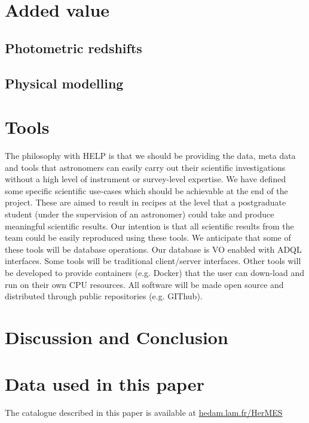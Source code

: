 \documentclass[usenatbib]{mnras}
\begin{document}
\section{Added value}

\subsection{Photometric redshifts}

\subsection{Physical modelling}

\section{Tools}

The philosophy with HELP is that we should be providing the data, meta data and
tools that astronomers can easily carry out their scientific investigations
without a high level of instrument or survey-level expertise.  We have defined
some specific scientific use-cases which should be achievable at the end of the
project.  These are aimed to result in recipes at the level  that a postgraduate
student (under the supervision of an astronomer) could take and produce
meaningful scientific results.  Our intention is that all scientific results
from the team could be easily reproduced using these tools.  We anticipate that
some of these tools will be database operations.  Our database is VO enabled
with ADQL interfaces.  Some tools will be traditional client/server interfaces.
Other tools will be developed to provide containers (e.g. Docker) that the user
can down-load and run on their own CPU resources.  All software will be made
open source and distributed through public repositories (e.g. GIThub).

\section{Discussion and Conclusion}



\section*{Data used in this paper}

The catalogue described in this paper is available at \url{hedam.lam.fr/HerMES}
\end{document}
